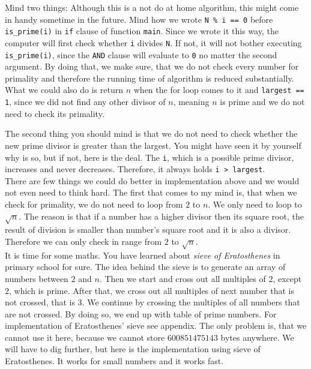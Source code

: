 \documentclass{book}
\begin{document}
Mind two things: Although this is a not do at home algorithm, this might come in handy sometime in the future. Mind how we wrote \texttt{N \% i == 0} before \texttt{is\_prime(i)} in \texttt{if} clause of function \texttt{main}. Since we wrote it this way, the computer will first check whether \texttt{i} divides \texttt{N}. If not, it will not bother executing \texttt{is\_prime(i)}, since the \texttt{AND} clause will evaluate to \texttt{0} no matter the second argument. By doing that, we make sure, that we do not check every number for primality and therefore the running time of algorithm is reduced substantially. What we could also do is return $n$ when the for loop comes to it and \texttt{largest == 1}, since we did not find any other divisor of $n$, meaning $n$ is prime and we do not need to check its primality.

The second thing you should mind is that we do not need to check whether the new prime divisor is greater than the largest. You might have seen it by yourself why is so, but if not, here is the deal. The \texttt{i}, which is a possible prime divisor, increases and never decreases. Therefore, it always holds \texttt{i > largest}.\\

There are few things we could do better in implementation above and we would not even need to think hard. The first that comes to my mind is, that when we check for primality, we do not need to loop from $2$ to $n$. We only need to loop to $\sqrt{n}$. The reason is that if a number has a higher divisor then its square root, the result of division is smaller than number's square root and it is also a divisor. Therefore we can only check in range from $2$ to $\sqrt{n}$.\\

It is time for some maths. You have learned about \textit{sieve of Eratosthenes} in primary school for sure. The idea behind the sieve is to generate an array of numbers between $2$ and $n$. Then we start and cross out all multiples of $2$, except $2$, which is prime. After that, we cross out all multiples of next number that is not crossed, that is $3$. We continue by crossing the multiples of all numbers that are not crossed. By doing so, we end up with table of prime numbers. For implementation of Eratosthenes' sieve see appendix. The only problem is, that we cannot use it here, because we cannot store $600851475143$ bytes anywhere. We will have to dig further, but here is the implementation using sieve of Eratosthenes. It works for small numbers and it works fast.
\end{document}
